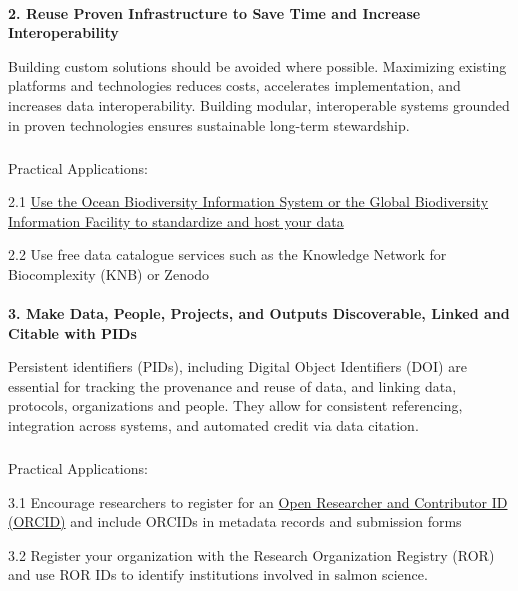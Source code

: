\documentclass[
  letterpaper,
  DIV=11,
  numbers=noendperiod]{scrartcl}
\makeatletter
\let\oldparagraph\paragraph
\renewcommand{\paragraph}{
    \@ifstar
      \xxxParagraphStar
      \xxxParagraphNoStar
  }
\newcommand{\xxxParagraphStar}[1]{\oldparagraph*{#1}\mbox{}}
\newcommand{\xxxParagraphNoStar}[1]{\oldparagraph{#1}\mbox{}}
\let\oldsubparagraph\subparagraph
\renewcommand{\subparagraph}{
    \@ifstar
      \xxxSubParagraphStar
      \xxxSubParagraphNoStar
  }
\newcommand{\xxxSubParagraphStar}[1]{\oldsubparagraph*{#1}\mbox{}}
\newcommand{\xxxSubParagraphNoStar}[1]{\oldsubparagraph{#1}\mbox{}}
\makeatother
\begin{document}
\paragraph{\texorpdfstring{\textbf{2. Reuse Proven Infrastructure to
Save Time and Increase
Interoperability}}{2. Reuse Proven Infrastructure to Save Time and Increase Interoperability}}\label{reuse-proven-infrastructure-to-save-time-and-increase-interoperability}

Building custom solutions should be avoided where possible. Maximizing
existing platforms and technologies reduces costs, accelerates
implementation, and increases data interoperability. Building modular,
interoperable systems grounded in proven technologies ensures
sustainable long-term stewardship.

\subparagraph{Practical Applications:}\label{practical-applications-1}

2.1 \href{https://doi.org/10.14286/duc6mu}{Use the Ocean Biodiversity
Information System or the Global Biodiversity Information Facility to
standardize and host your data}

2.2 Use free data catalogue services such as the Knowledge Network for
Biocomplexity (KNB) or Zenodo

\paragraph{\texorpdfstring{\textbf{3. Make Data, People, Projects, and
Outputs Discoverable, Linked and Citable with
PIDs}}{3. Make Data, People, Projects, and Outputs Discoverable, Linked and Citable with PIDs}}\label{make-data-people-projects-and-outputs-discoverable-linked-and-citable-with-pids}

Persistent identifiers (PIDs), including Digital Object Identifiers
(DOI) are essential for tracking the provenance and reuse of data, and
linking data, protocols, organizations and people. They allow for
consistent referencing, integration across systems, and automated credit
via data citation.

\subparagraph{Practical Applications:}\label{practical-applications-2}

3.1 Encourage researchers to register for an
\href{https://orcid.org/}{Open Researcher and Contributor ID (ORCID)}
and include ORCIDs in metadata records and submission forms

3.2 Register your organization with the Research Organization Registry
(ROR) and use ROR IDs to identify institutions involved in salmon
science.
\end{document}
